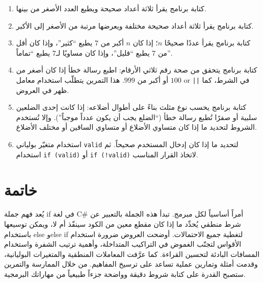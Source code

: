 \documentclass[12pt]{article}
\begin{document}
\begin{enumerate}
  \item كتابة برنامج يقرأ ثلاثة أعداد صحيحة ويطبع العدد الأصغر من بينها.
  \item كتابة برنامج يقرأ ثلاثة أعداد صحيحة مختلفة ويعرضها مرتبة من الأصغر إلى الأكبر.
  \item كتابة برنامج يقرأ عددًا صحيحًا \(n\)؛ إذا كان \(n\) أكبر من \(7\) يطبع ``كثير''، وإذا كان أقل من \(7\) يطبع ``قليل''، وإذا كان مساويًا لـ\(7\) يطبع ``تماماً''.
  \item كتابة برنامج يتحقق من صحة رقم ثلاثي الأرقام: اطبع رسالة خطأ إذا كان أصغر من \(100\) أو أكبر من \(999\). هذا التمرين يتطلّب استخدام معامل \textenglish{or} \texttt{||} في الشرط، كما ظهر في العروض.
  \item كتابة برنامج يحسب نوع مثلث بناءً على أطوال أضلاعه: إذا كانت إحدى الضلعين سلبية أو صفرًا تُطبع رسالة خطأ (``الضلع يجب أن يكون عدداً موجباً''). وإلا تُستخدم الشروط لتحديد ما إذا كان متساوي الأضلاع أو متساوي الساقين أو مختلف الأضلاع.
  \item استخدام متغيّر بولياني \verb|valid| لتحديد ما إذا كان إدخال المستخدم صحيحاً. ثم استخدام \verb|if (valid)| أو \verb|if (!valid)| لاتخاذ القرار المناسب.
\end{enumerate}

\section*{خاتمة}

يُعد فهم جملة \textenglish{if} في لغة C\# أمراً أساسياً لكل مبرمج. تبدأ هذه الجملة بالتعبير عن شرط منطقي يُحدِّد ما إذا كان مقطع معين من الكود سينفّذ أم لا، ويمكن توسيعها باستخدام \textenglish{else} و\textenglish{else if} لتغطية جميع الاحتمالات. أوضحت العروض ضرورة استخدام الأقواس لتجنّب الغموض في التراكيب المتداخلة، وأهمية ترتيب الشفرة واستخدام المسافات البادئة لتحسين القراءة. كما عرَّفت المعاملات المنطقية والمتغيرات البوليانية، وقدمت أمثلة وتمارين عملية تساعد على ترسيخ المفاهيم. من خلال الممارسة والتمرين ستصبح القدرة على كتابة شروط دقيقة وواضحة جزءاً طبيعياً من مهاراتك البرمجية.
\end{document}
